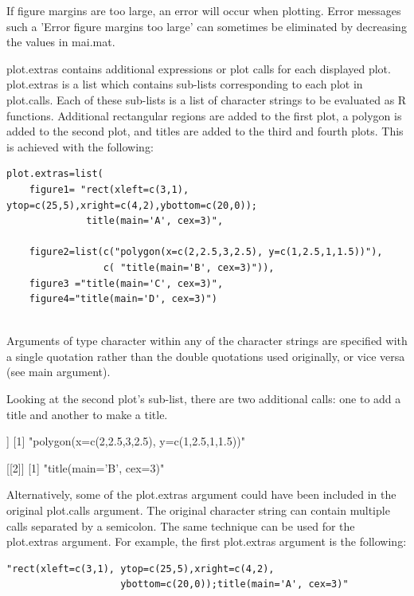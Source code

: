 \documentclass[]{article}
\begin{document}
 If figure margins are too large, an error will occur when plotting. Error messages such a 'Error figure margins too large' can sometimes be eliminated by decreasing the values in mai.mat.


\indent plot.extras contains additional expressions or plot calls for each displayed plot. plot.extras is a list which contains sub-lists corresponding to each plot in plot.calls. Each of these sub-lists is a list of character strings to be evaluated as R functions. Additional rectangular regions are added to the first plot, a polygon is added to the second plot, and titles are added to the third and fourth plots. This is achieved with the following: 

\begin{verbatim}
plot.extras=list(
    figure1= "rect(xleft=c(3,1), ytop=c(25,5),xright=c(4,2),ybottom=c(20,0));
              title(main='A', cex=3)",

    figure2=list(c("polygon(x=c(2,2.5,3,2.5), y=c(1,2.5,1,1.5))"),
                 c( "title(main='B', cex=3)")), 
    figure3 ="title(main='C', cex=3)", 
    figure4="title(main='D', cex=3)")


\end{verbatim}



\indent Arguments of type character within any of the character strings are specified with a single quotation rather than the double quotations used originally, or vice versa (see main argument).


\indent Looking at the second plot's sub-list, there are two additional calls: one to add a title and another to make a title. 

\begin{Schunk}
\begin{Soutput}
[[1]]
[1] "polygon(x=c(2,2.5,3,2.5), y=c(1,2.5,1,1.5))"

[[2]]
[1] "title(main='B', cex=3)"
\end{Soutput}
\end{Schunk}

 Alternatively, some of the plot.extras argument could have been included in the original plot.calls argument. The original character string can contain multiple calls separated by a semicolon. The same technique can be used for the plot.extras argument. For example, the first plot.extras argument is the following:

\begin{verbatim}
"rect(xleft=c(3,1), ytop=c(25,5),xright=c(4,2),
                    ybottom=c(20,0));title(main='A', cex=3)"
\end{verbatim}
\end{document}
